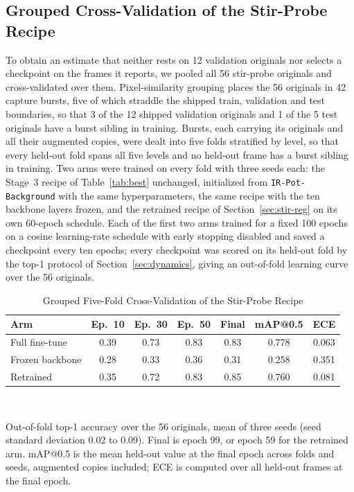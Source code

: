 ﻿\documentclass[journal]{IEEEtran}
\begin{document}
\subsection{Grouped Cross-Validation of the Stir-Probe Recipe}
\label{sec:stir-cv}
To obtain an estimate that neither rests on 12 validation originals nor selects a checkpoint on the frames it reports, we pooled all 56 stir-probe originals and cross-validated over them. Pixel-similarity grouping places the 56 originals in 42 capture bursts, five of which straddle the shipped train, validation and test boundaries, so that 3 of the 12 shipped validation originals and 1 of the 5 test originals have a burst sibling in training. Bursts, each carrying its originals and all their augmented copies, were dealt into five folds stratified by level, so that every held-out fold spans all five levels and no held-out frame has a burst sibling in training. Two arms were trained on every fold with three seeds each: the Stage~3 recipe of Table~\ref{tab:best} unchanged, initialized from \texttt{IR-Pot-Background} with the same hyperparameters, the same recipe with the ten backbone layers frozen, and the retrained recipe of Section~\ref{sec:stir-reg} on its own 60-epoch schedule. Each of the first two arms trained for a fixed 100 epochs on a cosine learning-rate schedule with early stopping disabled and saved a checkpoint every ten epochs; every checkpoint was scored on its held-out fold by the top-1 protocol of Section~\ref{sec:dynamics}, giving an out-of-fold learning curve over the 56 originals.

\begin{table}[!t]
\renewcommand{\arraystretch}{1.3}
\caption{Grouped Five-Fold Cross-Validation of the Stir-Probe Recipe}
\label{tab:stircv}
\centering
\footnotesize
\setlength{\tabcolsep}{3.5pt}
\begin{tabular}{l c c c c c c}
\toprule
\textbf{Arm} & \textbf{Ep.~10} & \textbf{Ep.~30} & \textbf{Ep.~50} & \textbf{Final} & \textbf{mAP@0.5} & \textbf{ECE} \\
\midrule
Full fine-tune & 0.39 & 0.73 & 0.83 & 0.83 & 0.778 & 0.063 \\
Frozen backbone & 0.28 & 0.33 & 0.36 & 0.31 & 0.258 & 0.351 \\
Retrained & 0.35 & 0.72 & 0.83 & 0.85 & 0.760 & 0.081 \\
\bottomrule
\end{tabular}
\\[2pt]
\parbox{\columnwidth}{\footnotesize Out-of-fold top-1 accuracy over the 56 originals, mean of three seeds (seed standard deviation 0.02 to 0.09). Final is epoch 99, or epoch 59 for the retrained arm. mAP@0.5 is the mean held-out value at the final epoch across folds and seeds, augmented copies included; ECE is computed over all held-out frames at the final epoch.}
\end{table}
\end{document}
